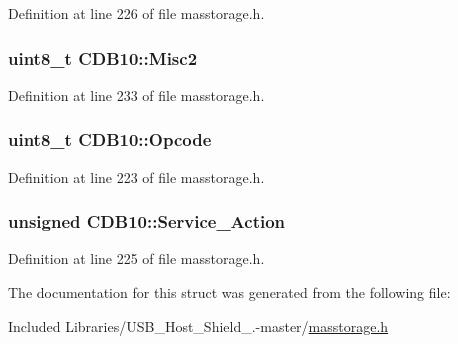 \-Definition at line 226 of file masstorage.\-h.

\hypertarget{struct_c_d_b10_a26b2c33b7867c33d19e77c6d873d7924}{
\subsubsection[{\-Misc2}]{\setlength{\rightskip}{0pt plus 5cm}uint8\-\_\-t {\bf \-C\-D\-B10\-::\-Misc2}}}\label{struct_c_d_b10_a26b2c33b7867c33d19e77c6d873d7924}


\-Definition at line 233 of file masstorage.\-h.

\hypertarget{struct_c_d_b10_af18bbff0fec1a1d31c741c542f2e92d6}{
\subsubsection[{\-Opcode}]{\setlength{\rightskip}{0pt plus 5cm}uint8\-\_\-t {\bf \-C\-D\-B10\-::\-Opcode}}}\label{struct_c_d_b10_af18bbff0fec1a1d31c741c542f2e92d6}


\-Definition at line 223 of file masstorage.\-h.

\hypertarget{struct_c_d_b10_af1cd479d32aae0c581b735eb5aa081bc}{
\subsubsection[{\-Service\-\_\-\-Action}]{\setlength{\rightskip}{0pt plus 5cm}unsigned {\bf \-C\-D\-B10\-::\-Service\-\_\-\-Action}}}\label{struct_c_d_b10_af1cd479d32aae0c581b735eb5aa081bc}


\-Definition at line 225 of file masstorage.\-h.



\-The documentation for this struct was generated from the following file\-:\begin{DoxyCompactItemize}
\item 
\-Included Libraries/\-U\-S\-B\-\_\-\-Host\-\_\-\-Shield\-\_.-\/master/\hyperlink{masstorage_8h}{masstorage.\-h}\end{DoxyCompactItemize}
